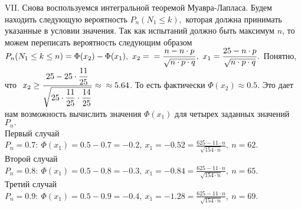 \documentclass{article}
\begin{document}
VII. Снова воспользуемся интегральной теоремой Муавра-Лапласа. Будем находить следующую вероятность \begin{math}
P_n(N_1 \leq k),
\end{math} которая должна принимать указанные в условии значения. Так как испытаний должно быть максимум \begin{math}
n
\end{math}, то можем переписать вероятность следующим образом \begin{math}
P_n(N_1 \leq k \leq n) = \Phi(x_2) - \Phi(x_1), \ x_2 = \\ = \displaystyle\frac{n - n\cdot p}{\sqrt{n \cdot p \cdot q}}, \ x_1 = \displaystyle\frac{25 - n\cdot p}{\sqrt{n \cdot p \cdot q}}.
\end{math} Понятно, что \begin{math}
 \ x_2 \geq \displaystyle\frac{25 - 25\cdot \displaystyle\frac{11}{25}}{\sqrt{25 \cdot\displaystyle\frac{11}{25} \cdot \displaystyle\frac{14}{25}}} \approx \\ \approx 5.64
\end{math}. То есть фактически \begin{math}
\Phi(x_2) \approx 0.5 \end{math}. Это дает нам возможность вычислить значения \begin{math}
\Phi(x_1) \end{math} для четырех заданных значений \begin{math}
P_n. \end{math}
\vspace{\baselineskip}
\\
Первый случай \begin{math}
P_n = 0.7:  \ \Phi(x_1) = 0.5 -  0.7 = - 0.2, \ x_1 = -0.52 = \displaystyle\frac{625 - 11\cdot n}{\sqrt{154 \cdot n}}, \ n = 62 \end{math}.
\vspace{\baselineskip}
\\
Второй случай \begin{math}
P_n = 0.8:  \ \Phi(x_1) = 0.5 - 0.8 = -0.3, \ x_1 = -0.84 = \displaystyle\frac{625 - 11\cdot n}{\sqrt{154 \cdot n}}, \ n = 65 \end{math}.
\vspace{\baselineskip}
\\
Третий случай \begin{math}
P_n = 0.9:  \ \Phi(x_1) = 0.5 - 0.9 = -0.4, \ x_1 = -1.28 = \displaystyle\frac{625 - 11\cdot n}{\sqrt{154 \cdot n}}, \ n = 69 \end{math}.
\end{document}
